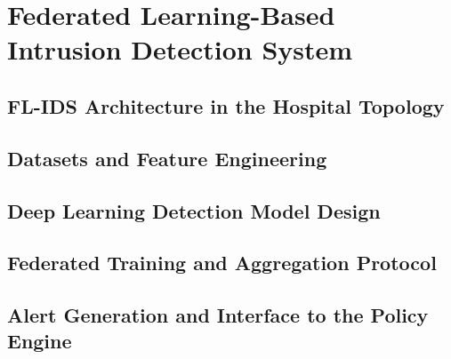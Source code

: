 \chapter{Federated Learning-Based Intrusion Detection System}
\label{ch:fl_ids}


\section{FL-IDS Architecture in the Hospital Topology}
\label{sec:fl_architecture}

\section{Datasets and Feature Engineering}
\label{sec:fl_datasets}

\section{Deep Learning Detection Model Design}
\label{sec:fl_model}

\section{Federated Training and Aggregation Protocol}
\label{sec:fl_training}

\section{Alert Generation and Interface to the Policy Engine}
\label{sec:fl_alert_interface}
